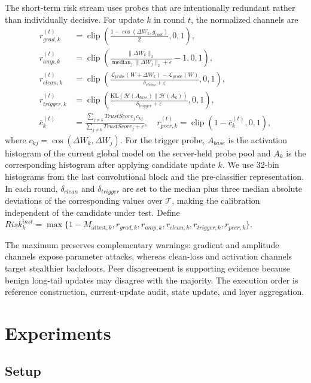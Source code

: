 \documentclass[runningheads,orivec]{llncs}
\begin{document}
The short-term risk stream uses probes that are intentionally redundant rather than individually decisive. For update $k$ in round $t$, the normalized channels are
\begin{align}
 r_{grad,k}^{(t)}&=\operatorname{clip}\!\left(\frac{1-\cos(\Delta W_k,g_{root})}{2},0,1\right),\\
 r_{amp,k}^{(t)}&=\operatorname{clip}\!\left(\frac{\|\Delta W_k\|_2}{\operatorname{median}_j\|\Delta W_j\|_2+\varepsilon}-1,0,1\right),\\
 r_{clean,k}^{(t)}&=\operatorname{clip}\!\left(\frac{\mathcal{L}_{probe}(W+\Delta W_k)-\mathcal{L}_{probe}(W)}{\delta_{clean}+\varepsilon},0,1\right),\\
 r_{trigger,k}^{(t)}&=\operatorname{clip}\!\left(\frac{\mathrm{KL}(\mathcal{H}(A_{base})\|\mathcal{H}(A_k))}{\delta_{trigger}+\varepsilon},0,1\right),\\
 \bar c_k^{(t)}&=\frac{\sum_{j\ne k}TrustScore_j\,c_{kj}}{\sum_{j\ne k}TrustScore_j+\varepsilon},\quad
 r_{peer,k}^{(t)}=\operatorname{clip}(1-\bar c_k^{(t)},0,1),
\end{align}
where $c_{kj}=\cos(\Delta W_k,\Delta W_j)$. For the trigger probe, $A_{base}$ is the activation histogram of the current global model on the server-held probe pool and $A_k$ is the corresponding histogram after applying candidate update $k$. We use 32-bin histograms from the last convolutional block and the pre-classifier representation. In each round, $\delta_{clean}$ and $\delta_{trigger}$ are set to the median plus three median absolute deviations of the corresponding values over $\mathcal{T}$, making the calibration independent of the candidate under test. Define $Risk_k^{inst}=\max\{1-M_{\text{attest},k},r_{grad,k},r_{amp,k},r_{clean,k},r_{trigger,k},r_{peer,k}\}$.

The maximum preserves complementary warnings: gradient and amplitude channels expose parameter attacks, whereas clean-loss and activation channels target stealthier backdoors. Peer disagreement is supporting evidence because benign long-tail updates may disagree with the majority. The execution order is reference construction, current-update audit, state update, and layer aggregation.

\section{Experiments}

\subsection{Setup}
\end{document}
